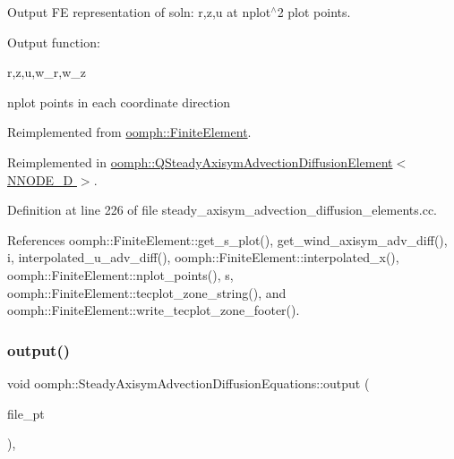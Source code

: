 Output FE representation of soln\+: r,z,u at nplot$^\wedge$2 plot points. 

Output function\+:

r,z,u,w\+\_\+r,w\+\_\+z

nplot points in each coordinate direction 

Reimplemented from \hyperlink{classoomph_1_1FiniteElement_afa9d9b2670f999b43e6679c9dd28c457}{oomph\+::\+Finite\+Element}.



Reimplemented in \hyperlink{classoomph_1_1QSteadyAxisymAdvectionDiffusionElement_a5dd4db916c9c81fd0f72631a2a16c915}{oomph\+::\+Q\+Steady\+Axisym\+Advection\+Diffusion\+Element$<$ N\+N\+O\+D\+E\+\_\+D $>$}.



Definition at line 226 of file steady\+\_\+axisym\+\_\+advection\+\_\+diffusion\+\_\+elements.\+cc.



References oomph\+::\+Finite\+Element\+::get\+\_\+s\+\_\+plot(), get\+\_\+wind\+\_\+axisym\+\_\+adv\+\_\+diff(), i, interpolated\+\_\+u\+\_\+adv\+\_\+diff(), oomph\+::\+Finite\+Element\+::interpolated\+\_\+x(), oomph\+::\+Finite\+Element\+::nplot\+\_\+points(), s, oomph\+::\+Finite\+Element\+::tecplot\+\_\+zone\+\_\+string(), and oomph\+::\+Finite\+Element\+::write\+\_\+tecplot\+\_\+zone\+\_\+footer().

\mbox{\label{classoomph_1_1SteadyAxisymAdvectionDiffusionEquations_a8d3b38d7db43bf626f2a57d785ab666f}} 
\subsubsection{\texorpdfstring{output()}{output()}\hspace{0.1cm}{\footnotesize\ttfamily [3/4]}}
{\footnotesize\ttfamily void oomph\+::\+Steady\+Axisym\+Advection\+Diffusion\+Equations\+::output (\begin{DoxyParamCaption}\item[{F\+I\+LE $\ast$}]{file\+\_\+pt }\end{DoxyParamCaption})\hspace{0.3cm}{\ttfamily [inline]}, {\ttfamily [virtual]}}




